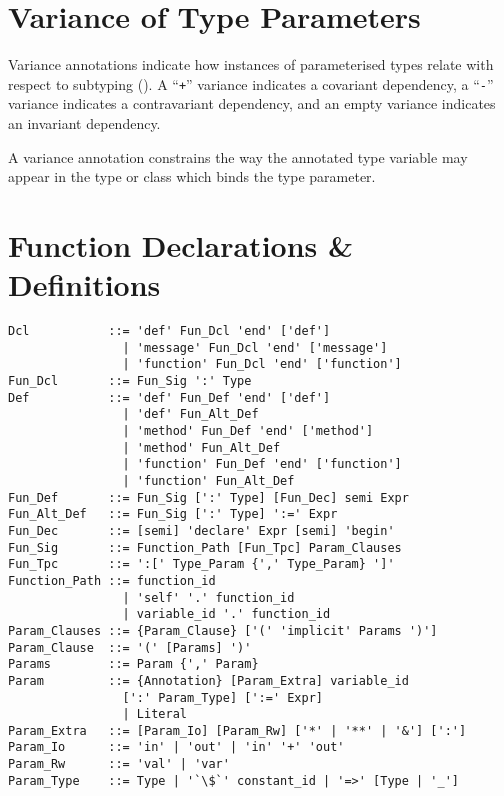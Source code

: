 
\section{Variance of Type Parameters}
\label{sec:variance-of-type-parameters}

Variance annotations indicate how instances of parameterised types relate with respect to subtyping (). A ``\lstinline!+!'' variance indicates a covariant dependency, a ``\lstinline!-!'' variance indicates a contravariant dependency, and an empty variance indicates an invariant dependency. 

A variance annotation constrains the way the annotated type variable may appear in the type or class which binds the type parameter. 


\section{Function Declarations \& Definitions}

\syntax\begin{lstlisting}[escapechar=`]
Dcl           ::= 'def' Fun_Dcl 'end' ['def']
                | 'message' Fun_Dcl 'end' ['message']
                | 'function' Fun_Dcl 'end' ['function']
Fun_Dcl       ::= Fun_Sig ':' Type
Def           ::= 'def' Fun_Def 'end' ['def']
                | 'def' Fun_Alt_Def
                | 'method' Fun_Def 'end' ['method']
                | 'method' Fun_Alt_Def
                | 'function' Fun_Def 'end' ['function']
                | 'function' Fun_Alt_Def
Fun_Def       ::= Fun_Sig [':' Type] [Fun_Dec] semi Expr
Fun_Alt_Def   ::= Fun_Sig [':' Type] ':=' Expr
Fun_Dec       ::= [semi] 'declare' Expr [semi] 'begin'
Fun_Sig       ::= Function_Path [Fun_Tpc] Param_Clauses
Fun_Tpc       ::= ':[' Type_Param {',' Type_Param} ']'
Function_Path ::= function_id
                | 'self' '.' function_id
                | variable_id '.' function_id
Param_Clauses ::= {Param_Clause} ['(' 'implicit' Params ')']
Param_Clause  ::= '(' [Params] ')'
Params        ::= Param {',' Param}
Param         ::= {Annotation} [Param_Extra] variable_id 
                [':' Param_Type] [':=' Expr]
                | Literal
Param_Extra   ::= [Param_Io] [Param_Rw] ['*' | '**' | '&'] [':']
Param_Io      ::= 'in' | 'out' | 'in' '+' 'out'
Param_Rw      ::= 'val' | 'var'
Param_Type    ::= Type | '`\$`' constant_id | '=>' [Type | '_']
\end{lstlisting}

